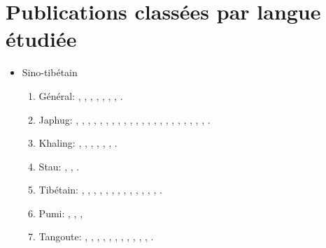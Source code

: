 \documentclass[oneside,a4paper,11pt]{article}
\newcommand{\langue}[2]{#2}
\begin{document}
\section{\langue{By languages}{Publications classées par langue étudiée}}
\begin{itemize}
\item \langue{Sino-Tibetan}{Sino-tibétain}
\begin{enumerate}
\item \langue{General}{Général}: \citet{jacques03s.houzhui}, \citet{jacques06morpho}, \citet{jacques07chang}, \citet{antonov12kumush}, \citet{jacques12agreement},    \citet{michaud-jacques12nasalite}, \citet{jacques16th}, \citet{jacques17rgy}.     
\item Japhug:  \citet{jacques04redupl},     \citet{jacques04these},   \citet{jacques07passif},  \citet{jacques07redupl}, \citet{jacques08},  \citet{jacques10gesar}, \citet{jacques10refl},  \citet{jacques10inverse},  \citet{jacques12incorp},   \citet{jacques12demotion},  \citet{jacques13harmonization},  \citet{jacques13tropative}, \citet{jacques14antipassive}, \citet{japhug14ideophones}, \citet{jacques14inverse}, \citet{jacques14linking}, \citet{jacques16comparative}, \citet{jacques15causative}, \citet{jacques15japhug}, \citet{jacques16relatives}, \citet{jacques16complementation}, \citet{jacques17sketch}, \citet{jacques17generic}.
\item Khaling: \citet{jacques12khaling},  \citet{jacques13derivational.khaling}, \citet{jacques14auditory}, \citet{jacques15derivational.khaling}, \citet{jacques15khaling},  \citet{jacques16si}, \citet{jacques16tonogenesis}.
\item Stau: \citet{antonov14rtau}, \citet{jacques14rtau}, \citet{jacques17stau}.
\item \langue{Tibetan}{Tibétain}:  \citet{jacques01dg}, \citet{jacques04thimphu}, \citet{jacques07naksatram},      \citet{jacques08debther},  \citet{jacques09wazur}, \citet{jacques09e},  \citet{jacques10zos},   \citet{jacques10ndr},  \citet{jacques11lingua},  \citet{jacques12internal},  \citet{jacques12transcription}, \citet{jacques13yod}, \citet{jacques14snom}, \citet{jacques14cone}.
\item Pumi:  \citet{michaud10bonin}, \citet{jacques11pumi.tone}, \citet{jacques11lingua}, 
\item \langue{Tangut}{Tangoute}: \citet{jacques06comparaison},  \citet{jacques07textes}, \citet{jacques08weiyu}, \citet{jacques08alternations},   \citet{jacques09tangutverb},  \citet{jacques10imperial},  \citet{jacques11tangut.verb}, \citet{jacques11ngwemi}, \citet{jacques11kinship},  \citet{jacques14esquisse}, \citet{jacques14ergative}, \citet{jacques16th}.

\end{enumerate}
\end{itemize}
\end{document}
